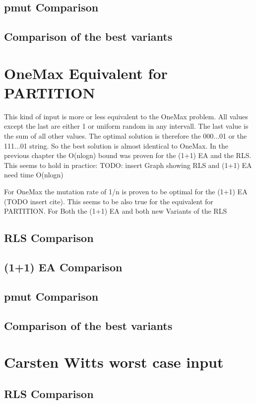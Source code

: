\subsection{pmut Comparison}
\subsection{Comparison of the best variants}

\section{OneMax Equivalent for PARTITION}
This kind of input is more or less equivalent to the OneMax problem. All values except the last are either 1 or uniform
random in any intervall. The last value is the sum of all other values. The optimal solution is therefore the 000...01 or
the 111...01 string. So the best solution is almost identical to OneMax. In the previous chapter the O(nlogn) bound was
proven for the (1+1) EA and the RLS. This seems to hold in practice:
TODO: insert Graph showing RLS and (1+1) EA need time O(nlogn)

For OneMax the mutation rate of 1/n is proven to be optimal for the (1+1) EA (TODO insert cite). This seems to be also
true for the equivalent for PARTITION. For Both the (1+1) EA and both new Variants of the RLS
\subsection{RLS Comparison}

\subsection{(1+1) EA Comparison}
\subsection{pmut Comparison}
\subsection{Comparison of the best variants}

\section{Carsten Witts worst case input}
\subsection{RLS Comparison}
